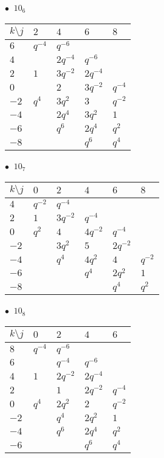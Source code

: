 \begin{minipage}{\linewidth}
$\bullet\ $ $10_{6}$ \vspace{0.5em} \\
\begin{tabular}{l|llll}
$k \setminus j$ & $2$ & $4$ & $6$ & $8$ \\
\hline
$6$ & $q^{-4}$ & $q^{-6}$ &  &  \\
$4$ &  & $2q^{-4}$ & $q^{-6}$ &  \\
$2$ & $1$ & $3q^{-2}$ & $2q^{-4}$ &  \\
$0$ &  & $2$ & $3q^{-2}$ & $q^{-4}$ \\
$-2$ & $q^{4}$ & $3q^{2}$ & $3$ & $q^{-2}$ \\
$-4$ &  & $2q^{4}$ & $3q^{2}$ & $1$ \\
$-6$ &  & $q^{6}$ & $2q^{4}$ & $q^{2}$ \\
$-8$ &  &  & $q^{6}$ & $q^{4}$ \\
\end{tabular}
\vspace{2em}
\end{minipage}
%
\begin{minipage}{\linewidth}
$\bullet\ $ $10_{7}$ \vspace{0.5em} \\
\begin{tabular}{l|lllll}
$k \setminus j$ & $0$ & $2$ & $4$ & $6$ & $8$ \\
\hline
$4$ & $q^{-2}$ & $q^{-4}$ &  &  &  \\
$2$ & $1$ & $3q^{-2}$ & $q^{-4}$ &  &  \\
$0$ & $q^{2}$ & $4$ & $4q^{-2}$ & $q^{-4}$ &  \\
$-2$ &  & $3q^{2}$ & $5$ & $2q^{-2}$ &  \\
$-4$ &  & $q^{4}$ & $4q^{2}$ & $4$ & $q^{-2}$ \\
$-6$ &  &  & $q^{4}$ & $2q^{2}$ & $1$ \\
$-8$ &  &  &  & $q^{4}$ & $q^{2}$ \\
\end{tabular}
\vspace{2em}
\end{minipage}
%
\begin{minipage}{\linewidth}
$\bullet\ $ $10_{8}$ \vspace{0.5em} \\
\begin{tabular}{l|llll}
$k \setminus j$ & $0$ & $2$ & $4$ & $6$ \\
\hline
$8$ & $q^{-4}$ & $q^{-6}$ &  &  \\
$6$ &  & $q^{-4}$ & $q^{-6}$ &  \\
$4$ & $1$ & $2q^{-2}$ & $2q^{-4}$ &  \\
$2$ &  & $1$ & $2q^{-2}$ & $q^{-4}$ \\
$0$ & $q^{4}$ & $2q^{2}$ & $2$ & $q^{-2}$ \\
$-2$ &  & $q^{4}$ & $2q^{2}$ & $1$ \\
$-4$ &  & $q^{6}$ & $2q^{4}$ & $q^{2}$ \\
$-6$ &  &  & $q^{6}$ & $q^{4}$ \\
\end{tabular}
\vspace{2em}
\end{minipage}
